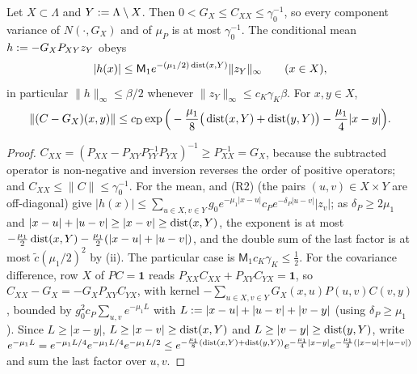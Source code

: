 \begin{lemma}[conditioning]\label{rot:lem:R1sch}
Let $X\subset\Lambda$ and $Y:=\Lambda\setminus X$. Then $0<G_X\le C_{XX}\le\gamma_0^{-1}$, so every component variance of $N(\cdot,G_X)$ and of $\mu_P$ is at most $\gamma_0^{-1}$. The conditional mean $h:=-G_XP_{XY}z_Y$ obeys
\[
|h(x)|\le\mathsf M_1e^{-(\mu_1/2)\operatorname{dist}(x,Y)}\|z_Y\|_\infty\qquad(x\in X),
\]
in particular $\|h\|_\infty\le\beta/2$ whenever $\|z_Y\|_\infty\le c_K\gamma_K\beta$. For $x,y\in X$,
\[
\|(C-G_X)(x,y)\|\le c_{\mathrm D}\exp\Big(-\frac{\mu_1}8\big(\operatorname{dist}(x,Y)+\operatorname{dist}(y,Y)\big)-\frac{\mu_1}4|x-y|\Big).
\]
\end{lemma}
\begin{proof}
$C_{XX}=(P_{XX}-P_{XY}P_{YY}^{-1}P_{YX})^{-1}\ge P_{XX}^{-1}=G_X$, because the subtracted operator is non-negative and inversion reverses the order of positive operators; and $C_{XX}\le\|C\|\le\gamma_0^{-1}$. For the mean,  and (R2) (the pairs $(u,v)\in X\times Y$ are off-diagonal) give $|h(x)|\le\sum_{u\in X,v\in Y}g_0e^{-\mu_1|x-u|}c_Pe^{-\delta_P|u-v|}|z_v|$; as $\delta_P\ge2\mu_1$ and $|x-u|+|u-v|\ge|x-v|\ge\operatorname{dist}(x,Y)$, the exponent is at most $-\frac{\mu_1}2\operatorname{dist}(x,Y)-\frac{\mu_1}2(|x-u|+|u-v|)$, and the double sum of the last factor is at most $\tilde c(\mu_1/2)^2$ by (ii). The particular case is $\mathsf M_1c_K\gamma_K\le\frac12$. For the covariance difference, row $X$ of $PC=\mathbf 1$ reads $P_{XX}C_{XX}+P_{XY}C_{YX}=\mathbf 1$, so $C_{XX}-G_X=-G_XP_{XY}C_{YX}$, with kernel $-\sum_{u\in X,v\in Y}G_X(x,u)P(u,v)C(v,y)$, bounded by $g_0^2c_P\sum_{u,v}e^{-\mu_1L}$ with $L:=|x-u|+|u-v|+|v-y|$ (using $\delta_P\ge\mu_1$). Since $L\ge|x-y|$, $L\ge|x-v|\ge\operatorname{dist}(x,Y)$ and $L\ge|v-y|\ge\operatorname{dist}(y,Y)$, write $e^{-\mu_1L}=e^{-\mu_1L/4}e^{-\mu_1L/4}e^{-\mu_1L/2}\le e^{-\frac{\mu_1}8(\operatorname{dist}(x,Y)+\operatorname{dist}(y,Y))}e^{-\frac{\mu_1}4|x-y|}e^{-\frac{\mu_1}2(|x-u|+|u-v|)}$ and sum the last factor over $u,v$.
\end{proof}


